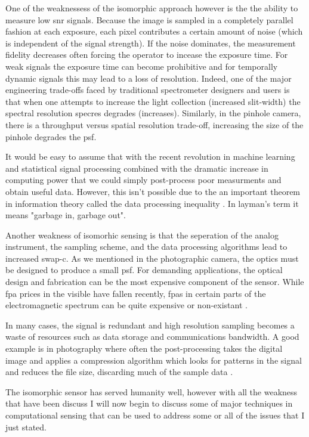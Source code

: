 One of the weaknessess of the isomorphic approach however is the the ability to measure low \gls{snr} signals. Because the image is sampled in a completely parallel fashion at each exposure, each pixel contributes a certain amount of noise (which is independent of the signal strength). If the noise dominates, the measurement fidelity decreases often forcing the operator to incease the exposure time. For weak signals the exposure time can become prohibitive and for temporally dynamic signals this may lead to a loss of resolution. Indeed, one of the major engineering trade-offs faced by traditional spectrometer designers and users is that when one attempts to increase the light collection (increased slit-width) the spectral resolution \gls{specres} degrades (increases). Similarly, in the pinhole camera, there is a throughput versus spatial resolution trade-off, increasing the size of the pinhole degrades the \gls{psf}.


It would be easy to assume that with the recent revolution in machine learning and statistical signal processing combined with the dramatic increase in computing power that we could simply post-process poor measurments and obtain useful data. However, this isn't possible due to the an important theorem in information theory called the data processing inequality \cite{cover2012elements}. In layman's term it means "garbage in, garbage out".

Another weakness of isomorhic sensing is that the seperation of the analog instrument, the sampling scheme, and the data processing algorithms lead to increased \gls{swap-c}. As we mentioned in the photographic camera, the optics must be designed to produce a small \gls{psf}. For demanding applications, the optical design and fabrication can be the most expensive component of the sensor. While \gls{fpa} prices in the visible have fallen recently, \glspl{fpa} in certain parts of the electromagnetic spectrum can be quite expensive or non-existant \cite{noor2011compressive}.

In many cases, the signal is redundant and high resolution sampling becomes a waste of resources such as data storage and communications bandwidth. A good example is in photography where often the post-processing takes the digital image and applies a compression algorithm which looks for patterns in the signal and reduces the file size, discarding much of the sample data \cite{taubman2012jpeg2000}. 

The isomorphic sensor has served humanity well, however with all the weakness that have been discuss I will now begin to discuss some of major techniques in computational sensing that can be used to address some or all of the issues that I just stated. 

